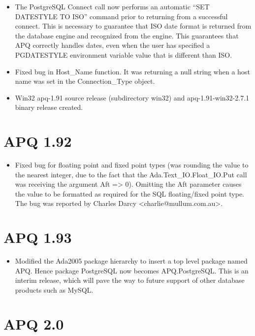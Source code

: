 \documentclass[english,letterpaper]{book}
\begin{document}
\begin{itemize}
   \item The PostgreSQL Connect call now performs an automatic {}``SET DATESTYLE
         TO ISO'' command prior to returning from a successful connect. This
         is necessary to guarantee that ISO date format is returned from the
         database engine and recognized from the engine. This guarantees that
         APQ correctly handles dates, even when the user has specified a PGDATESTYLE
         environment variable value that is different than ISO.
         \item Fixed bug in Host\_Name function. It was returning a null string when
         a host name was set in the Connection\_Type object.
   \item Win32 apq-1.91 source release (subdirectory win32) and apq-1.91-win32-2.7.1
         binary release created.
\end{itemize}

\section*{APQ 1.92}

\begin{itemize}
   \item Fixed bug for floating point and fixed point types (was rounding the
         value to the nearest integer, due to the fact that the Ada.Text\_IO.Float\_IO.Put
         call was receiving the argument Aft => 0). Omitting the Aft parameter
         causes the value to be formatted as required for the SQL floating/fixed
         point type. The bug was reported by Charles Darcy <charlie@mullum.com.au>.
\end{itemize}

\section*{APQ 1.93}

\begin{itemize}
   \item Modified the Ada2005 package hierarchy to insert a top level package
         named APQ. Hence package PostgreSQL now becomes APQ.PostgreSQL. This
         is an interim release, which will pave the way to future support of
         other database products such as MySQL.
\end{itemize}

\section*{APQ 2.0}
\end{document}

